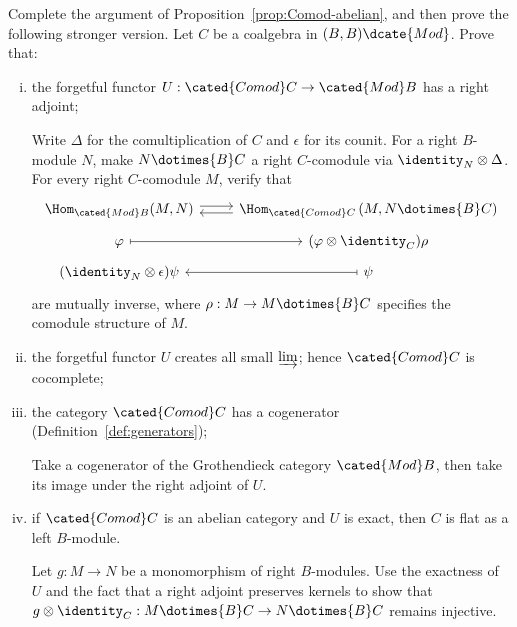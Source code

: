 	\item Complete the argument of Proposition~\ref{prop:Comod-abelian}, and
	then prove the following stronger version. Let $C$ be a coalgebra in
	$(B,B)\dcate{Mod}$. Prove that:
	\begin{enumerate}[(i)]
		\item the forgetful functor $U:\cated{Comod}C\to\cated{Mod}B$ has a
		right adjoint;

		\begin{hint}
			Write $\Delta$ for the comultiplication of $C$ and $\epsilon$ for its
			counit. For a right $B$-module $N$, make $N\dotimes{B}C$ a right
			$C$-comodule via $\identity_N\otimes\Delta$. For every right
			$C$-comodule $M$, verify that
			\[\begin{tikzcd}[row sep=tiny]
				\Hom_{\cated{Mod}B}(M, N) \arrow[shift left, r] & \Hom_{\cated{Comod}C}\left(M, N \dotimes{B} C\right) \arrow[shift left, l] \\
				\varphi \arrow[mapsto, r] & (\varphi \otimes \identity_C) \rho \\
				(\identity_N \otimes \epsilon) \psi & \psi \arrow[mapsto, l]
			\end{tikzcd}\]
			are mutually inverse, where $\rho:M\to M\dotimes{B}C$ specifies the
			comodule structure of $M$.
		\end{hint}
		\item the forgetful functor $U$ creates all small $\varinjlim$; hence
		$\cated{Comod}C$ is cocomplete;
		\item the category $\cated{Comod}C$ has a cogenerator
		(Definition~\ref{def:generators});

		\begin{hint}
			Take a cogenerator of the Grothendieck category $\cated{Mod}B$, then
			take its image under the right adjoint of $U$.
		\end{hint}
		\item if $\cated{Comod}C$ is an abelian category and $U$ is exact, then
		$C$ is flat as a left $B$-module.

		\begin{hint}
			Let $g:M\to N$ be a monomorphism of right $B$-modules. Use the
			exactness of $U$ and the fact that a right adjoint preserves kernels
			to show that
			$g\otimes\identity_C:M\dotimes{B}C\to N\dotimes{B}C$ remains
			injective.
		\end{hint}
	\end{enumerate}

